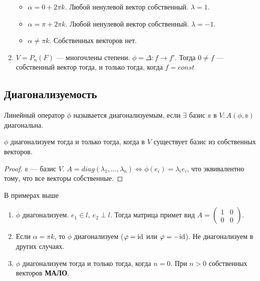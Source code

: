 \begin{Examples}
\begin{enumerate}
        \begin{itemize}
            \item $\alpha = 0 + 2\pi k$. Любой ненулевой вектор собственный. $\lambda = 1$.
            \item $\alpha = \pi + 2\pi k$. Любой ненулевой вектор собственный. $\lambda = -1$.
            \item $\alpha \neq \pi k$. Собственных векторов нет.
        \end{itemize}
        \item $V = P_n(F)$ --- многочлены степени. $\phi = \Delta\colon f \rightarrow f'$. Тогда $0 \neq f$ --- собственный вектор тогда, и только тогда, когда $f = const$ 
    \end{enumerate}
\end{Examples}

\subsection*{Диагонализуемость}
\begin{Def}
    Линейный оператор $\phi$ называется диагонализуемым, если $\exists$ базис $\mathbb{e}$ в $V\colon A(\phi, \mathbb{e})$ диагональна. 
\end{Def}
\begin{Suggestion}
    $\phi$ диагонализуем тогда и только тогда, когда в $V$ существует базис из собственных векторов.
\end{Suggestion}

\begin{proof}
    $\mathbb{e}$ --- базис $V$. $A = diag(\lambda_1, \ldots, \lambda_n) \Leftrightarrow \phi(e_i) = \lambda_i e_i$, что эквивалентно тому, что все векторы собственные.
\end{proof}
В примерах выше
\begin{enumerate}
    \item $\phi$ диагонализуем. $e_1 \in l,\ e_2 \perp l$. Тогда матрица примет вид $A = \begin{pmatrix}
        1 &0 \\
        0 &0
    \end{pmatrix}$.
    \item Если $\alpha = \pi k$, то $\phi$ диагонализуем ($\varphi = \mathrm{id}$ или $\varphi = - \mathrm{id}$). Не диагонализуем в других случаях.
    \item $\phi$ диагонализуем тогда и только тогда, когда $n = 0$. При $n > 0$ собственных векторов \textbf{МАЛО}.
\end{enumerate}


